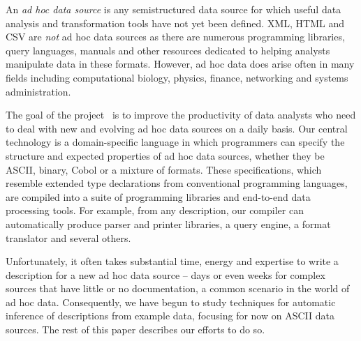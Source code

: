 \documentclass{article}
\begin{document}
\label{intro}

An {\em ad hoc data source} is any semistructured data source
for which useful data analysis and transformation tools
have not yet been defined. XML, HTML and CSV are {\em not} 
ad hoc data sources as there are numerous programming libraries,
query languages, manuals and other resources dedicated to
helping analysts manipulate data in these formats.
However, ad hoc data does arise often in many fields including
computational biology, physics, finance, networking and 
systems administration.

The goal of the \pads{} project~\cite{padsweb} is to improve the
productivity of data analysts who need to deal with new and evolving
ad hoc data sources on a daily basis.  Our central technology is a
domain-specific language in which programmers can specify the
structure and expected properties of ad hoc data sources, whether they
be ASCII, binary, Cobol or a mixture of formats.  These
specifications, which resemble extended type declarations from
conventional programming languages, are compiled into a suite of
programming libraries and end-to-end data processing tools.  For
example, from any \pads{} description, our compiler can automatically
produce parser and printer libraries, a query engine, a format translator
and several others.

Unfortunately, it often takes substantial time, energy and expertise
to write a \pads{} description for a new ad hoc data source
-- days or even weeks for complex sources that have little or
no documentation, a common scenario in the world of ad hoc data.
Consequently, we have begun to study techniques for automatic
inference of \pads{} descriptions from example data, focusing for now
on ASCII data sources.   The rest of this 
paper describes our efforts to do so.


\end{document}
